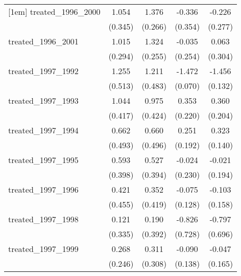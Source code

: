 {\begin{tabular}{l*{4}{c}}
[1em]
treated\_1996\_2000&       1.054\sym{**} &       1.376\sym{***}&      -0.336         &      -0.226         \\
            &     (0.345)         &     (0.266)         &     (0.354)         &     (0.277)         \\
[1em]
treated\_1996\_2001&       1.015\sym{***}&       1.324\sym{***}&      -0.035         &       0.063         \\
            &     (0.294)         &     (0.255)         &     (0.254)         &     (0.304)         \\
[1em]
treated\_1997\_1992&       1.255\sym{*}  &       1.211\sym{*}  &      -1.472\sym{***}&      -1.456\sym{***}\\
            &     (0.513)         &     (0.483)         &     (0.070)         &     (0.132)         \\
[1em]
treated\_1997\_1993&       1.044\sym{*}  &       0.975\sym{*}  &       0.353         &       0.360         \\
            &     (0.417)         &     (0.424)         &     (0.220)         &     (0.204)         \\
[1em]
treated\_1997\_1994&       0.662         &       0.660         &       0.251         &       0.323\sym{*}  \\
            &     (0.493)         &     (0.496)         &     (0.192)         &     (0.140)         \\
[1em]
treated\_1997\_1995&       0.593         &       0.527         &      -0.024         &      -0.021         \\
            &     (0.398)         &     (0.394)         &     (0.230)         &     (0.194)         \\
[1em]
treated\_1997\_1996&       0.421         &       0.352         &      -0.075         &      -0.103         \\
            &     (0.455)         &     (0.419)         &     (0.128)         &     (0.158)         \\
[1em]
treated\_1997\_1998&       0.121         &       0.190         &      -0.826         &      -0.797         \\
            &     (0.335)         &     (0.392)         &     (0.728)         &     (0.696)         \\
[1em]
treated\_1997\_1999&       0.268         &       0.311         &      -0.090         &      -0.047         \\
            &     (0.246)         &     (0.308)         &     (0.138)         &     (0.165)         \\

\end{tabular}}
